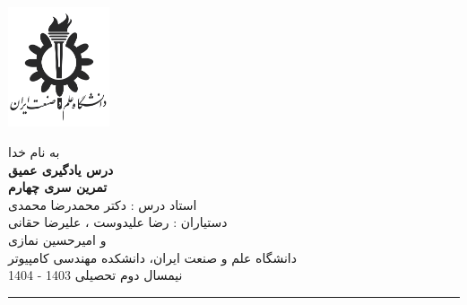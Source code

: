 \begin{minipage}{0.1\textwidth}
\includegraphics[width=3cm]{etc/IUST}
\end{minipage}%
\hfill%
\begin{minipage}{0.6\textwidth}\centering
\fontsize{13pt}{13pt}\selectfont
به‌ نام خدا \\
\textbf{درس یادگیری عمیق} \\
\textbf{تمرین سری چهارم}\\
استاد درس : دکتر محمدرضا محمدی \\
دستیاران :  رضا علیدوست ، علیرضا حقانی \\و امیرحسین نمازی\\
\vspace{0.25cm}
\begingroup
\fontsize{11pt}{11pt}\selectfont
دانشگاه علم و صنعت ایران، دانشکده مهندسی کامپیوتر \\
نیمسال دوم تحصیلی 1403 - 1404 \\
\endgroup
\end{minipage}%
\hfill%
\begin{minipage}{0.1\textwidth}

\end{minipage}

\vspace{0.5cm}

\noindent\rule{\textwidth}{1pt}